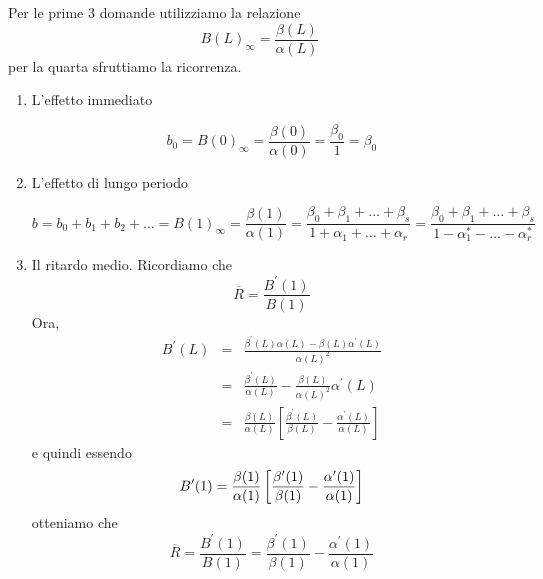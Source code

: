 \documentclass[a4paper]{report}
\theoremstyle{remark}
\begin{document}
\noindent Per le prime 3 domande utilizziamo la relazione%
\begin{equation*}
B(L)_{\infty }=\frac{\beta (L)}{\alpha (L)}
\end{equation*}%
per la quarta sfruttiamo la ricorrenza.

\begin{enumerate}
\item L'effetto immediato

\begin{equation*}
b_{0}=B(0)_{\infty }=\frac{\beta (0)}{\alpha (0)}=\frac{\beta _{0}}{1}=\beta
_{0}
\end{equation*}

\item L'effetto di lungo periodo

\begin{equation*}
b=b_{0}+b_{1}+b_{2}+\ldots =B(1)_{\infty }=\frac{\beta (1)}{\alpha (1)}=%
\frac{\beta _{0}+\beta _{1}+\ldots +\beta _{s}}{1+\alpha _{1}+\ldots +\alpha
_{r}}=\frac{\beta _{0}+\beta _{1}+\ldots +\beta _{s}}{1-\alpha _{1}^{\ast
}-\ldots -\alpha _{r}^{\ast }}
\end{equation*}

\item Il ritardo medio. Ricordiamo che%
\begin{equation*}
\overline{R}=\frac{B^{\prime }(1)}{B(1)}
\end{equation*}%
Ora, 
\begin{eqnarray*}
B^{\prime }(L) &=&\frac{\beta ^{\prime }(L)\alpha (L)-\beta (L)\alpha
^{\prime }(L)}{\alpha (L)^{2}} \\
&=&\frac{\beta ^{\prime }(L)}{\alpha (L)}-\frac{\beta (L)}{\alpha (L)^{2}}%
\alpha ^{\prime }(L) \\
&=&\frac{\beta (L)}{\alpha (L)}\left[ \frac{\beta ^{\prime }(L)}{\beta (L)}-%
\frac{\alpha ^{\prime }(L)}{\alpha (L)}\right]
\end{eqnarray*}%
e quindi essendo 
\begin{equation*}
B^{\prime }(1)=\frac{\beta (1)}{\alpha (1)}\left[ \frac{\beta ^{\prime }(1)}{%
\beta (1)}-\frac{\alpha ^{\prime }(1)}{\alpha (1)}\right]
\end{equation*}%
otteniamo che%
\begin{equation*}
\overline{R}=\frac{B^{\prime }(1)}{B(1)}=\frac{\beta ^{\prime }(1)}{\beta (1)%
}-\frac{\alpha ^{\prime }(1)}{\alpha (1)}
\end{equation*}
\end{enumerate}
\end{document}
